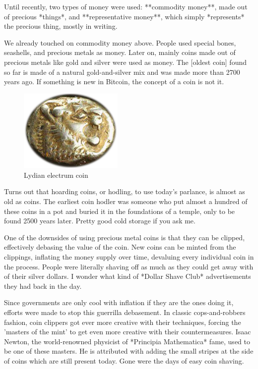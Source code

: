 Until recently, two types of money were used: **commodity money**, made
out of precious *things*, and **representative money**, which simply
*represents* the precious thing, mostly in writing.

We already touched on commodity money above. People used special bones,
seashells, and precious metals as money. Later on, mainly coins made out
of precious metals like gold and silver were used as money. The [oldest
coin] found so far is made of a natural gold-and-silver mix and was made
more than 2700 years ago. If something is new in Bitcoin, the concept of
a coin is not it.

\begin{figure}
  \centering
  \includegraphics[width=5cm]{assets/images/lydian-coin-stater.png}
  \caption{Lydian electrum coin}
  \label{fig:lydian-coin-stater}
\end{figure}

Turns out that hoarding coins, or hodling, to use today's parlance, is
almost as old as coins. The earliest coin hodler was someone who put
almost a hundred of these coins in a pot and buried it in the
foundations of a temple, only to be found 2500 years later. Pretty good
cold storage if you ask me.

One of the downsides of using precious metal coins is that they can be
clipped, effectively debasing the value of the coin. New coins can be
minted from the clippings, inflating the money supply over time,
devaluing every individual coin in the process. People were literally
shaving off as much as they could get away with of their silver dollars.
I wonder what kind of *Dollar Shave Club* advertisements they had back
in the day.

Since governments are only cool with inflation if they are the ones
doing it, efforts were made to stop this guerrilla debasement. In
classic cops-and-robbers fashion, coin clippers got ever more creative
with their techniques, forcing the 'masters of the mint' to get even
more creative with their countermeasures. Isaac Newton, the
world-renowned physicist of *Principia Mathematica* fame, used to be one
of these masters. He is attributed with adding the small stripes at the
side of coins which are still present today. Gone were the days of easy
coin shaving.

